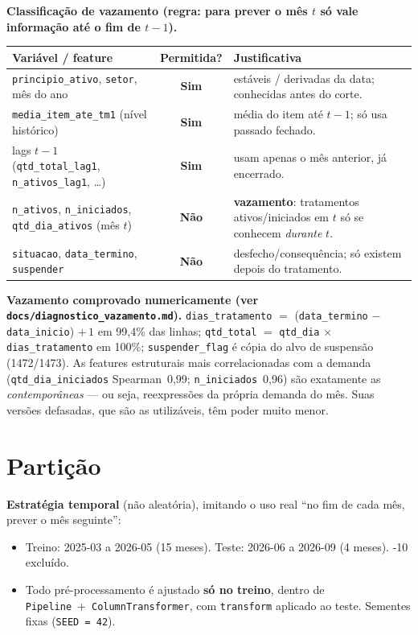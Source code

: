 \documentclass[11pt,a4paper]{article}
\newcommand{\sm}{\textbf{\textcolor{verdeF}{Sim}}}
\newcommand{\nao}{\textbf{\textcolor{vermelhoL}{Não}}}
\begin{document}
\textbf{Classificação de vazamento (regra: para prever o mês $t$ só vale informação até o fim de $t-1$).}
\begin{tabularx}{\textwidth}{@{}>{\raggedright\arraybackslash}p{5.0cm} c X@{}}
\toprule
\textbf{Variável / feature} & \textbf{Permitida?} & \textbf{Justificativa} \\
\midrule
\texttt{principio\_ativo}, \texttt{setor}, mês do ano & \sm & estáveis / derivadas da data; conhecidas antes do corte. \\
\texttt{media\_item\_ate\_tm1} (nível histórico) & \sm & média do item até $t-1$; só usa passado fechado. \\
lags $t{-}1$ (\texttt{qtd\_total\_lag1}, \texttt{n\_ativos\_lag1}, \dots) & \sm & usam apenas o mês anterior, já encerrado. \\
\texttt{n\_ativos}, \texttt{n\_iniciados}, \texttt{qtd\_dia\_ativos} (mês $t$) & \nao & \textbf{vazamento}: tratamentos ativos/iniciados em $t$ só se conhecem \emph{durante} $t$. \\
\texttt{situacao}, \texttt{data\_termino}, \texttt{suspender} & \nao & desfecho/consequência; só existem depois do tratamento. \\
\bottomrule
\end{tabularx}

\textbf{Vazamento comprovado numericamente (ver \texttt{docs/diagnostico\_vazamento.md}).} \texttt{dias\_tratamento} $=$ (\texttt{data\_termino} $-$ \texttt{data\_inicio}) $+\,1$ em 99,4\% das linhas; \texttt{qtd\_total} $=$ \texttt{qtd\_dia} $\times$ \texttt{dias\_tratamento} em 100\%; \texttt{suspender\_flag} é cópia do alvo de suspensão (1472/1473). As features estruturais mais correlacionadas com a demanda (\texttt{qtd\_dia\_iniciados} Spearman~0,99; \texttt{n\_iniciados}~0,96) são exatamente as \emph{contemporâneas} --- ou seja, reexpressões da própria demanda do mês. Suas versões defasadas, que são as utilizáveis, têm poder muito menor.

\section{Partição}
\textbf{Estratégia temporal} (não aleatória), imitando o uso real ``no fim de cada mês, prever o mês seguinte'':
\begin{itemize}
    \item Treino: 2025-03 a 2026-05 (15 meses). \quad Teste: 2026-06 a 2026-09 (4 meses). -10 excluído.
    \item Todo pré-processamento é ajustado \textbf{só no treino}, dentro de \texttt{Pipeline}~+~\texttt{ColumnTransformer}, com \texttt{transform} aplicado ao teste. Sementes fixas (\texttt{SEED~=~42}).
\end{itemize}
\end{document}

